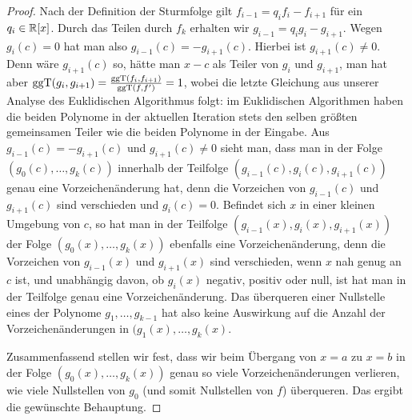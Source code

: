 \documentclass[11pt]{article}
\numberwithin{equation}{section}
\begin{document}
\begin{proof}
Nach der Definition der Sturmfolge gilt $f_{i-1} = q_i f_i - f_{i+1}$ für ein $q_i \in \mathbb{R}[x]$. Durch das Teilen durch $f_k$ erhalten wir $g_{i-1} = q_i g_i - g_{i+1}$. Wegen $g_i(c)=0$ hat man also $g_{i-1} (c) = - g_{i+1}(c)$. Hierbei ist $g_{i+1}(c) \ne 0$. Denn wäre $g_{i+1}(c)$ so, hätte man $x-c$ als Teiler von $g_i$ und $g_{i+1}$, man hat aber  $\operatorname{ggT}(g_i,g_{i+1}) = \frac{\operatorname{ggT}(f_i,f_{i+1})}{\operatorname{ggT}(f,f')} = 1$, wobei die letzte Gleichung aus unserer Analyse des Euklidischen Algorithmus folgt: im Euklidischen Algorithmen haben die beiden Polynome in der aktuellen Iteration stets den selben größten gemeinsamen Teiler wie die beiden Polynome in der Eingabe. Aus $g_{i-1}(c) = - g_{i+1}(c)$ und $g_{i+1}(c) \ne 0$ sieht man, dass man in der Folge $(g_0(c),\ldots,g_k(c))$ innerhalb der Teilfolge $(g_{i-1}(c),g_i(c),g_{i+1}(c))$ genau eine Vorzeichenänderung hat, denn die Vorzeichen von $g_{i-1}(c)$ und $g_{i+1}(c)$ sind verschieden und $g_i(c) =0$. Befindet sich $x$ in einer kleinen Umgebung von $c$, so hat man in der Teilfolge $(g_{i-1}(x), g_i(x), g_{i+1}(x))$ der Folge $(g_0(x),\ldots,g_k(x))$ ebenfalls eine Vorzeichenänderung, denn die Vorzeichen von $g_{i-1}(x)$ und $g_{i+1}(x)$ sind verschieden, wenn $x$ nah genug an $c$ ist, und unabhängig davon, ob $g_i(x)$ negativ, positiv oder null, ist hat man in der Teilfolge genau eine Vorzeichenänderung. Das überqueren einer Nullstelle eines der Polynome $g_1,\ldots,g_{k-1}$ hat also keine Auswirkung auf  die Anzahl der Vorzeichenänderungen in $(g_1(x),\ldots,g_k(x)$. 


Zusammenfassend stellen wir fest, dass wir beim Übergang von $x=a$ zu $x=b$ in der Folge $(g_0(x),\ldots,g_k(x))$ genau so viele Vorzeichenänderungen verlieren, wie viele Nullstellen von $g_0$ (und somit Nullstellen von $f$) überqueren. Das ergibt die gewünschte Behauptung. 
\end{proof} 
\end{document}
